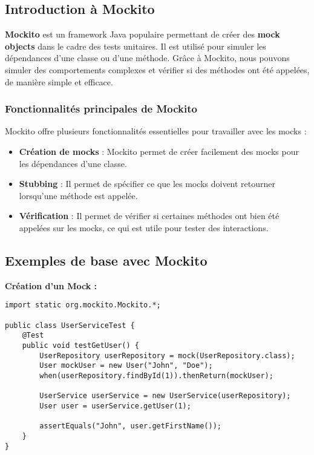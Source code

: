 \documentclass[12pt,a4paper]{article}
\begin{document}
\subsection{Introduction à Mockito}
\textbf{Mockito} est un framework Java populaire permettant de créer des \textbf{mock objects} dans le cadre des tests unitaires. Il est utilisé pour simuler les dépendances d'une classe ou d'une méthode. Grâce à Mockito, nous pouvons simuler des comportements complexes et vérifier si des méthodes ont été appelées, de manière simple et efficace.

\subsubsection{Fonctionnalités principales de Mockito}
Mockito offre plusieurs fonctionnalités essentielles pour travailler avec les mocks :
\begin{itemize}
    \item \textbf{Création de mocks} : Mockito permet de créer facilement des mocks pour les dépendances d'une classe.
    \item \textbf{Stubbing} : Il permet de spécifier ce que les mocks doivent retourner lorsqu'une méthode est appelée.
    \item \textbf{Vérification} : Il permet de vérifier si certaines méthodes ont bien été appelées sur les mocks, ce qui est utile pour tester des interactions.
\end{itemize}

\subsection{Exemples de base avec Mockito}
\textbf{Création d'un Mock :}
\begin{lstlisting}
import static org.mockito.Mockito.*;

public class UserServiceTest {
    @Test
    public void testGetUser() {
        UserRepository userRepository = mock(UserRepository.class);
        User mockUser = new User("John", "Doe");
        when(userRepository.findById(1)).thenReturn(mockUser);

        UserService userService = new UserService(userRepository);
        User user = userService.getUser(1);

        assertEquals("John", user.getFirstName());
    }
}
\end{lstlisting}
\end{document}
